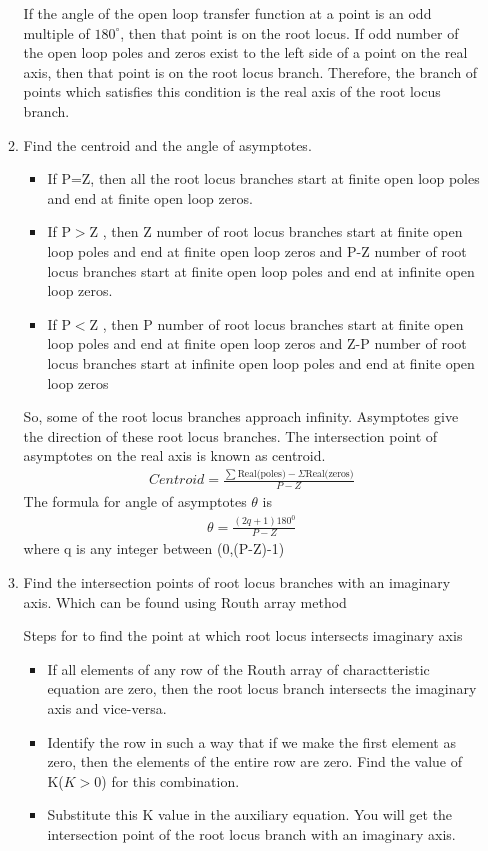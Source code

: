 \begin{enumerate}[label=\thesection.\arabic*.,ref=\thesection.\theenumi]
\begin{enumerate}
 If the angle of the open loop transfer function at a point is an odd multiple of $180^{\circ}$, then that point is on the root locus. If odd number of the open loop poles and zeros exist to the left side of a point on the real axis, then that point is on the root locus branch. Therefore, the branch of points which satisfies this condition is the real axis of the root locus branch.
	\item Find the centroid and the angle of asymptotes.
	\begin{itemize}
	\item If P=Z, then all the root locus branches start at finite open loop poles and end at finite open loop zeros.
	\item If P$>$Z , then Z number of root locus branches start at finite open loop poles and end at finite open loop zeros and P-Z number of root locus branches start at finite open loop poles and end at infinite open loop zeros.
	\item If P$<$Z , then P number of root locus branches start at finite open loop poles and end at finite open loop zeros and Z-P number of root locus branches start at infinite open loop poles and end at finite open loop zeros

	\end{itemize}
So, some of the root locus branches approach infinity. Asymptotes give the direction of these root locus branches. The intersection point of asymptotes on the real axis is known as centroid.
\begin{align}
Centroid =\frac{\sum \text {Real(poles)}-\Sigma \text {Real(zeros)}}{P-Z}
\end{align}
The formula for angle of asymptotes $\theta$ is
\begin{align}
\theta=\frac{(2 q+1) 180^{0}}{P-Z}
\end{align}
where q is any integer between (0,(P-Z)-1)


	\item Find the intersection points of root locus branches with an imaginary axis. Which can be found using Routh array method

Steps for to find the point at which root locus intersects imaginary axis
\begin{itemize}
\item If all elements of any row of the Routh array of charactteristic equation are zero, then the root locus branch intersects the imaginary axis and vice-versa.
\item Identify the row in such a way that if we make the first element as zero, then the elements of the entire row are zero. Find the value of K($K>0$) for this combination.
\item Substitute this K value in the auxiliary equation. You will get the intersection point of the root locus branch with an imaginary axis.



\end{itemize}
\end{enumerate}
\end{enumerate}
